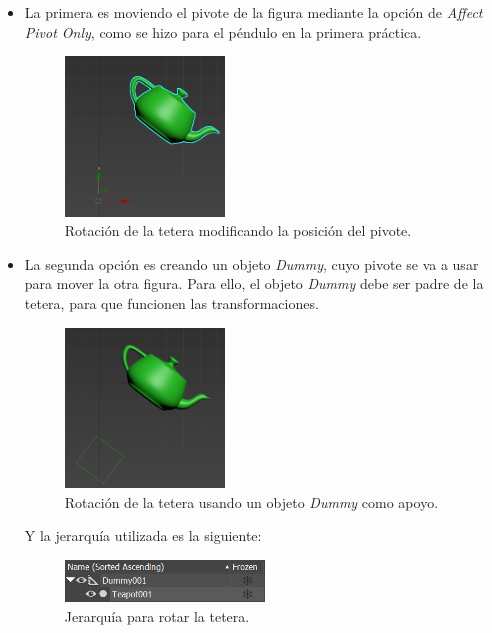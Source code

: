 \documentclass{article}
\begin{document}
\begin{itemize}
    \item La primera es moviendo el pivote de la figura mediante la opción de \textit{Affect Pivot Only}, como se hizo para el péndulo en la primera práctica.
    
    \begin{figure}[H]
        \centering
        \includegraphics[width=0.4\textwidth]{imagenes/tetepivote.png}
        \caption{Rotación de la tetera modificando la posición del pivote.}
     \end{figure}    
    
    \item La segunda opción es creando un objeto \textit{Dummy}, cuyo pivote se va a usar para mover la otra figura. Para ello, el objeto \textit{Dummy} debe ser padre de la tetera, para que funcionen las transformaciones.
    \begin{figure}[H]
        \centering
        \includegraphics[width=0.4\textwidth]{imagenes/tetedummy.png}
        \caption{Rotación de la tetera usando un objeto \textit{Dummy} como apoyo.}
     \end{figure}    

     Y la jerarquía utilizada es la siguiente:

     \begin{figure}[H]
        \centering
        \includegraphics[width=0.5\textwidth]{imagenes/tetejer.png}
        \caption{Jerarquía para rotar la tetera.}
     \end{figure}         
\end{itemize}
\end{document}

